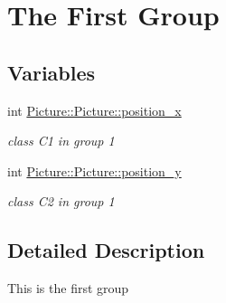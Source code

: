 \hypertarget{group__group1}{}\section{The First Group}
\label{group__group1}
\subsection*{Variables}
\begin{DoxyCompactItemize}
\item 
\mbox{\label{group__group1_gabc618c40aa01ec5878903a3170e1867a}} 
int \hyperlink{group__group1_gabc618c40aa01ec5878903a3170e1867a}{Picture\+::\+Picture\+::position\+\_\+x}
\begin{DoxyCompactList}\small\item\em class C1 in group 1 \end{DoxyCompactList}\item 
\mbox{\label{group__group1_gaad6be8d081af96530b6de3094b979af9}} 
int \hyperlink{group__group1_gaad6be8d081af96530b6de3094b979af9}{Picture\+::\+Picture\+::position\+\_\+y}
\begin{DoxyCompactList}\small\item\em class C2 in group 1 \end{DoxyCompactList}\end{DoxyCompactItemize}


\subsection{Detailed Description}
This is the first group 